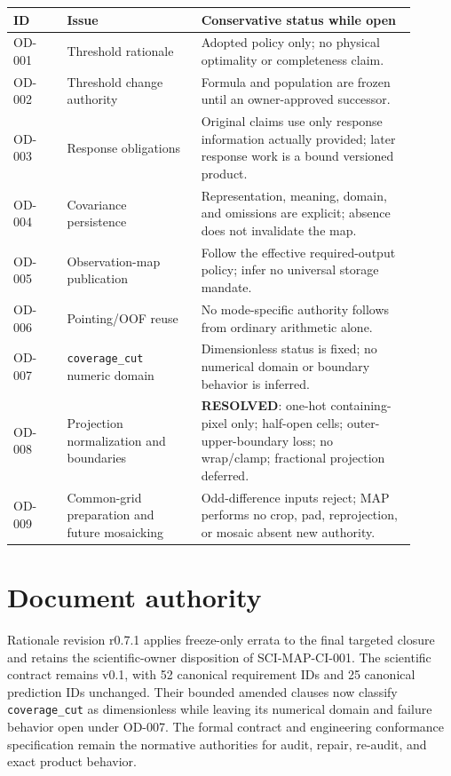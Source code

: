 \documentclass[10pt]{article}
\newcommand{\code}[1]{\nolinkurl{#1}}
\begin{document}
\begin{longtable}{L{0.12\linewidth}L{0.30\linewidth}L{0.48\linewidth}}
\toprule ID & Issue & Conservative status while open \\
\midrule
OD-001 & Threshold rationale & Adopted policy only; no physical optimality or completeness claim.\\
OD-002 & Threshold change authority & Formula and population are frozen until an owner-approved successor.\\
OD-003 & Response obligations & Original claims use only response information actually provided; later response work is a bound versioned product.\\
OD-004 & Covariance persistence & Representation, meaning, domain, and omissions are explicit; absence does not invalidate the map.\\
OD-005 & Observation-map publication & Follow the effective required-output policy; infer no universal storage mandate.\\
OD-006 & Pointing/OOF reuse & No mode-specific authority follows from ordinary arithmetic alone.\\
OD-007 & \code{coverage_cut} numeric domain & Dimensionless status is fixed; no numerical domain or boundary behavior is inferred.\\
OD-008 & Projection normalization and boundaries & \textbf{RESOLVED}: one-hot containing-pixel only; half-open cells; outer-upper-boundary loss; no wrap/clamp; fractional projection deferred.\\
OD-009 & Common-grid preparation and future mosaicking & Odd-difference inputs reject; MAP performs no crop, pad, reprojection, or mosaic absent new authority.\\
\bottomrule
\end{longtable}

\section{Document authority}
Rationale revision r0.7.1 applies freeze-only errata to the final targeted closure and
retains the scientific-owner disposition of SCI-MAP-CI-001. The scientific contract
remains v0.1, with 52 canonical requirement IDs and 25 canonical prediction
IDs unchanged. Their bounded amended clauses now classify
\code{coverage_cut} as dimensionless while leaving its numerical domain and
failure behavior open under OD-007. The formal contract and engineering
conformance specification remain the normative authorities for audit,
repair, re-audit, and exact product behavior.
\end{document}

